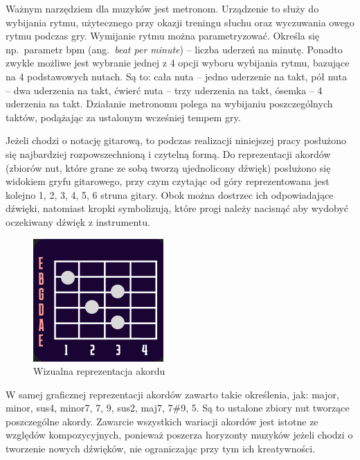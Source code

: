 Ważnym narzędziem dla muzyków jest metronom. Urządzenie to służy do wybijania rytmu, użytecznego przy okazji treningu słuchu oraz wyczuwania owego rytmu podczas gry. 
Wymijanie rytmu można parametryzować. Określa się np.\ parametr bpm (ang.~\emph{beat per minute}) -- liczba uderzeń na minutę. Ponadto zwykle możliwe jest wybranie jednej z 4 opcji wyboru wybijania rytmu, bazujące na 4 podstawowych nutach. Są to: cała nuta -- jedno uderzenie na takt, pół nuta -- dwa uderzenia na takt, ćwierć nuta -- trzy uderzenia na takt, ósemka -- 4 uderzenia na takt. Działanie metronomu polega na wybijaniu poszczególnych taktów, podążając za ustalonym wcześniej tempem gry. 

Jeżeli chodzi o notację gitarową, to podczas realizacji niniejszej pracy posłużono się najbardziej rozpowszechnioną i czytelną formą. Do reprezentacji akordów (zbiorów nut, które grane ze sobą tworzą ujednolicony dźwięk) posłużono się widokiem gryfu gitarowego, przy czym czytając od góry reprezentowana jest kolejno 1, 2, 3, 4, 5, 6 struna gitary. Obok można dostrzec ich odpowiadające dźwięki, natomiast kropki symbolizują, które progi należy nacisnąć aby wydobyć oczekiwany dźwięk z instrumentu.
\begin{figure}[htb]
	\centering
	\includegraphics[width=.5\linewidth]{rys02/akord2.2}
	\caption{Wizualna reprezentacja akordu} \label{fig:pageLayout}
\end{figure}

W samej graficznej reprezentacji akordów zawarto takie określenia, jak: major, minor, sus4, minor7, 7, 9, sus2, maj7, 7\#9, 5. Są to ustalone zbiory nut tworzące poszczególne akordy. Zawarcie wszystkich wariacji akordów jest istotne ze względów kompozycyjnych, ponieważ poszerza horyzonty muzyków jeżeli chodzi o tworzenie nowych dźwięków, nie ograniczając przy tym ich kreatywności. 

